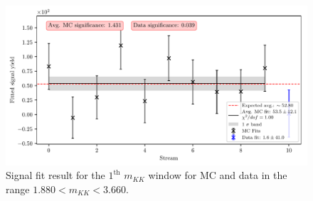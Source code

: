 \begin{figure}[H]
	\centering
	\captionsetup{width=0.8\linewidth}
	\includegraphics[width=\linewidth]{fig/sig_mKK_9}
	\caption{Signal fit result for the $1^{\mathrm{th}}$ $m_{KK}$ window for MC and data in the range $1.880  < m_{KK} < 3.660$.}
\end{figure}